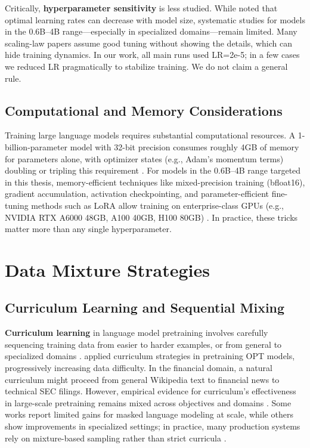 Critically, \textbf{hyperparameter sensitivity} is less studied. While \textcite{mccandlish2018empirical} noted that optimal learning rates can decrease with model size, systematic studies for models in the 0.6B–4B range—especially in specialized domains—remain limited. Many scaling-law papers assume good tuning without showing the details, which can hide training dynamics. In our work, all main runs used LR=2e-5; in a few cases we reduced LR pragmatically to stabilize training. We do not claim a general rule.

\subsection{Computational and Memory Considerations}

Training large language models requires substantial computational resources. A 1-billion-parameter model with 32-bit precision consumes roughly 4GB of memory for parameters alone, with optimizer states (e.g., Adam's momentum terms) doubling or tripling this requirement \parencite{rajbhandari2020zero,kingma2014adam}. For models in the 0.6B–4B range targeted in this thesis, memory-efficient techniques like mixed-precision training (bfloat16), gradient accumulation, activation checkpointing, and parameter-efficient fine-tuning methods such as LoRA allow training on enterprise-class GPUs (e.g., NVIDIA RTX A6000 48GB, A100 40GB, H100 80GB) \parencite{narayanan2021efficient,hu2021lora}. In practice, these tricks matter more than any single hyperparameter.

\section{Data Mixture Strategies}

\subsection{Curriculum Learning and Sequential Mixing}

\textbf{Curriculum learning} in language model pretraining involves carefully sequencing training data from easier to harder examples, or from general to specialized domains \parencite{bengio2009curriculum}. \textcite{wu2022opt} applied curriculum strategies in pretraining OPT models, progressively increasing data difficulty. In the financial domain, a natural curriculum might proceed from general Wikipedia text to financial news to technical SEC filings. However, empirical evidence for curriculum's effectiveness in large-scale pretraining remains mixed across objectives and domains \parencite{longpre2023pretrainer}. Some works report limited gains for masked language modeling at scale, while others show improvements in specialized settings; in practice, many production systems rely on mixture-based sampling rather than strict curricula \parencite{raffel2020exploring,wu2022opt}.

